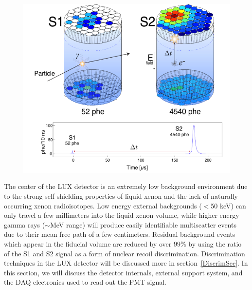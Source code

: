  \begin{figure} 
\includegraphics[scale=.5]{LUXevent.png} 
\label{LUXevent}
\end{figure}

The center of the LUX detector is an extremely low background environment due to the strong self shielding properties of liquid xenon and the lack of naturally occurring xenon radioisotopes.  Low energy external backgrounds ($<$50 keV) can only travel a few millimeters into the liquid xenon volume, while higher energy gamma rays ($\sim$MeV range) will produce easily identifiable multiscatter events due to their mean free path of a few centimeters.  Residual background events which appear in the fiducial volume are reduced by over 99\% by using the ratio of the S1 and S2 signal as a form of nuclear recoil discrimination.  Discrimination techniques in the LUX detector will be discussed more in section~\ref{DiscrimSec}.  In this section, we will  discuss the detector internals, external support system, and the DAQ electronics used to read out the PMT signal.  

